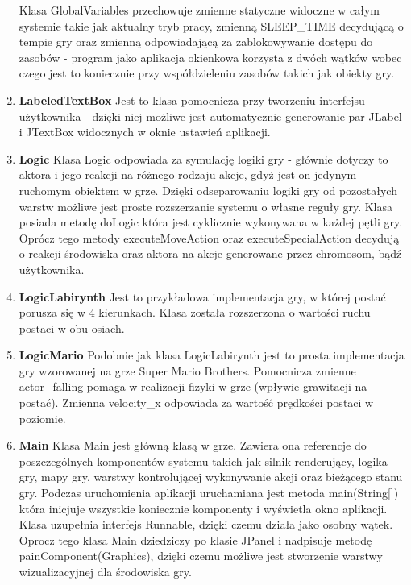 \begin{par}
\begin{enumerate}
	Klasa GlobalVariables przechowuje zmienne statyczne widoczne w całym systemie takie jak aktualny tryb pracy, zmienną SLEEP\_TIME decydującą o tempie gry oraz zmienną odpowiadającą za zablokowywanie dostępu do zasobów - program jako aplikacja okienkowa korzysta z dwóch wątków wobec czego jest to koniecznie przy współdzieleniu zasobów takich jak obiekty gry.
	\item{\bf LabeledTextBox }\newline
	Jest to klasa pomocnicza przy tworzeniu interfejsu użytkownika - dzięki niej możliwe jest automatycznie generowanie par JLabel i JTextBox widocznych w oknie ustawień aplikacji.
	\item{\bf Logic }\newline
	Klasa Logic odpowiada za symulację logiki gry - głównie dotyczy to aktora i jego reakcji na różnego rodzaju akcje, gdyż jest on jedynym ruchomym obiektem w grze. Dzięki odseparowaniu logiki gry od pozostałych warstw możliwe jest proste rozszerzanie systemu o własne reguły gry. Klasa posiada metodę doLogic która jest cyklicznie wykonywana w każdej pętli gry. Oprócz tego metody executeMoveAction oraz executeSpecialAction decydują o reakcji środowiska oraz aktora na akcje generowane przez chromosom, bądź użytkownika.
	\item{\bf LogicLabirynth }\newline
	Jest to przykładowa implementacja gry, w której postać porusza się w 4 kierunkach. Klasa została rozszerzona o wartości ruchu postaci w obu osiach.
	\item{\bf LogicMario }\newline
	Podobnie jak klasa LogicLabirynth jest to prosta implementacja gry wzorowanej na grze Super Mario Brothers. Pomocnicza zmienne actor_falling pomaga w realizacji fizyki w grze (wpływie grawitacji na postać). Zmienna velocity_x odpowiada za wartość prędkości postaci w poziomie.
	\item{\bf Main }\newline
	Klasa Main jest główną klasą w grze. Zawiera ona referencje do poszczególnych komponentów systemu takich jak silnik renderujący, logika gry, mapy gry, warstwy kontrolującej wykonywanie akcji oraz bieżącego stanu gry.
	Podczas uruchomienia aplikacji uruchamiana jest metoda main(String[]) która inicjuje wszystkie koniecznie komponenty i wyświetla okno aplikacji.
	Klasa uzupełnia interfejs Runnable, dzięki czemu działa jako osobny wątek. Oprocz tego klasa Main dziedziczy po klasie JPanel i nadpisuje metodę painComponent(Graphics), dzięki czemu możliwe jest stworzenie warstwy wizualizacyjnej dla środowiska gry.

\end{enumerate}
\end{par}
